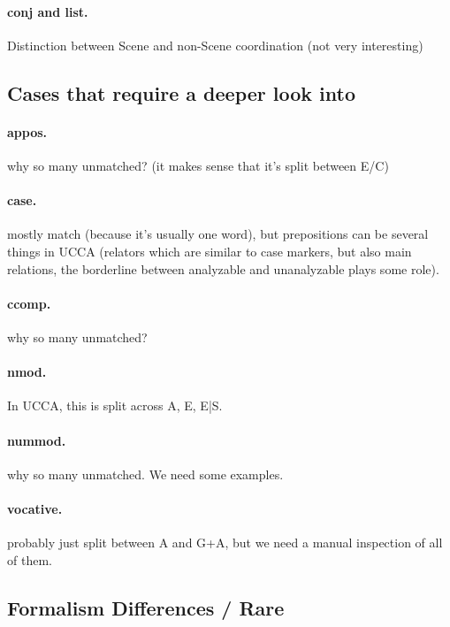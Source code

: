 \documentclass[11pt,a4paper]{article}
\begin{document}
\paragraph{conj and list.}
Distinction between Scene and non-Scene coordination (not very interesting)



\subsection{Cases that require a deeper look into}

\paragraph{appos.}
why so many unmatched? (it makes sense that it's split between E/C)

\paragraph{case.}
mostly match (because it's usually one word), but prepositions can be several things in UCCA (relators which are similar to case markers, but also main relations, the borderline between analyzable and unanalyzable plays some role).

\paragraph{ccomp.}
why so many unmatched?

\paragraph{nmod.}
In UCCA, this is split across A, E, E|S. 

\paragraph{nummod.}
why so many unmatched. We need some examples.

\paragraph{vocative.}
probably just split between A and G+A, but we need a manual inspection of all of them.



\subsection{Formalism Differences / Rare}
\end{document}
